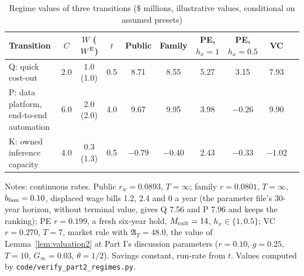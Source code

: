 \begin{table}[t]
\centering
\caption{Regime values of three transitions (\$ millions, illustrative values, conditional on assumed presets)}\label{tab:reg-rank}
\footnotesize
\begin{tabular}{@{}lccccccccc@{}}
\toprule
Transition & $C$ & $W$ ($W^{\rm E}$) & $t$ & Public & Family & PE, $h_x=1$ & PE, $h_x=0.5$ & VC\\
\midrule
Q: quick cost-out & 2.0 & 1.0 (1.0) & 0.5 & 8.71 & 8.55 & 5.27 & 3.15 & 7.93\\
P: data platform, end-to-end automation & 6.0 & 2.0 (2.0) & 4.0 & 9.67 & 9.95 & 3.98 & $-0.26$ & 9.90\\
K: owned inference capacity & 4.0 & 0.3 (1.3) & 0.5 & $-0.79$ & $-0.40$ & 2.43 & $-0.33$ & $-1.02$\\
\bottomrule
\end{tabular}

\smallskip
\begin{minipage}{0.95\linewidth}\footnotesize
Notes: continuous rates. Public $r_w=0.0893$, $T=\infty$; family $r=0.0801$, $T=\infty$, $b_{\rm fam}=0.10$, displaced wage bills 1.2, 2.4 and 0 a year (the parameter file's 30-year horizon, without terminal value, gives Q 7.56 and P 7.96 and keeps the ranking); PE $r=0.199$, a fresh six-year hold, $M_{\rm exit}=14$, $h_x\in\{1,0.5\}$; VC $r=0.270$, $T=7$, market rule with $\mathfrak A_T=48.0$, the value of Lemma~\ref{lem:valuation2} at Part I's discussion parameters ($r=0.10$, $g=0.25$, $T=10$, $G_\infty=0.03$, $\theta=1/2$). Savings constant, run-rate from $t$. Values computed by \texttt{code/verify\_part2\_regimes.py}.
\end{minipage}
\end{table}

